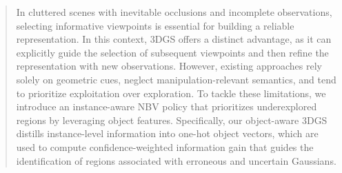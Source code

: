 \begin{abstract}

In cluttered scenes with inevitable occlusions and incomplete observations, selecting informative viewpoints is essential for building a reliable representation.
In this context, \ac{3DGS} offers a distinct advantage, as it can explicitly guide the selection of subsequent viewpoints and then refine the representation with new observations.
However, existing approaches rely solely on geometric cues, neglect manipulation-relevant semantics, and tend to prioritize exploitation over exploration.
To tackle these limitations, we introduce an instance-aware \ac{NBV} policy that prioritizes underexplored regions by leveraging object features.
Specifically, our object-aware \ac{3DGS} distills instance-level information into one-hot object vectors, which are used to compute confidence-weighted information gain that guides the identification of regions associated with erroneous and uncertain Gaussians.

\end{abstract}
